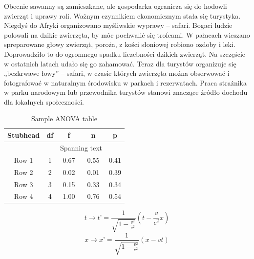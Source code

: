 \documentclass[14pt]{beamer}
\begin{document}
\begin{frame}{\color{black}{Ludzie na sawannie}}
    \tiny  Obecnie sawanny są zamieszkane, ale gospodarka ogranicza się do hodowli zwierząt i uprawy roli. Ważnym czynnikiem ekonomicznym stała się turystyka. Niegdyś do Afryki organizowano myśliwskie wyprawy – safari. Bogaci ludzie polowali na dzikie zwierzęta, by móc pochwalić się trofeami. W pałacach wieszano spreparowane głowy zwierząt, poroża, z kości słoniowej robiono ozdoby i leki. Doprowadziło to do ogromnego spadku liczebności dzikich zwierząt. Na szczęście w ostatnich latach udało się go zahamować. Teraz dla turystów organizuje się „bezkrwawe łowy” – safari, w czasie których zwierzęta można obserwować i fotografować w naturalnym środowisku w parkach i rezerwatach. Praca strażnika w parku narodowym lub przewodnika turystów stanowi znaczące źródło dochodu dla lokalnych społeczności.
\end{frame}

\begin{frame}{\color{black}{Tabela}}
    \begin{table}[]
        \centering
        \caption{Sample ANOVA table}
        \begin{tabular}{c c c c c} 
            \hline
            Stubhead & df & f & n & p \\ [0.5ex] 
            \hline
            & & \multicolumn{2}{c}{Spanning text} \\
            Row 1 & 1 & 0.67 & 0.55 & 0.41 \\
            Row 2 & 2 & 0.02 & 0.01 & 0.39 \\
            Row 3 & 3 & 0.15 & 0.33 & 0.34 \\
            Row 4 & 4 & 1.00 & 0.76 & 0.54 \\
            \hline
        \end{tabular}
    \end{table}
\end{frame}

\begin{frame}{\color{black}{Wzór}}
    \begin{displaymath}
        t \rightarrow t’ = \frac{1}{\sqrt{1-\frac{v^{2}}{c^{2}}}}(t-\frac{v}{c^{2}}x)
    \end{displaymath}
    \begin{displaymath}
        x \rightarrow x’ = \frac{1}{\sqrt{1-\frac{v^{2}}{c^{2}}}}(x-vt)
    \end{displaymath}
\end{frame}
\end{document}

